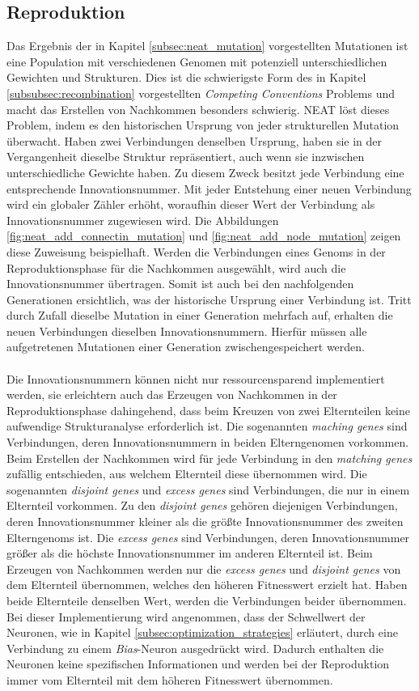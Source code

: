 \subsection{Reproduktion}
\label{subsec:neat_reproduction}
Das Ergebnis der in Kapitel \ref{subsec:neat_mutation} vorgestellten Mutationen ist eine Population mit verschiedenen Genomen mit potenziell unterschiedlichen Gewichten und Strukturen. Dies ist die schwierigste Form des in Kapitel \ref{subsubsec:recombination} vorgestellten \emph{Competing Conventions} Problems und macht das Erstellen von Nachkommen besonders schwierig. \ac{NEAT} löst dieses Problem, indem es den historischen Ursprung von jeder strukturellen Mutation überwacht. Haben zwei Verbindungen denselben Ursprung, haben sie in der Vergangenheit dieselbe Struktur repräsentiert, auch wenn sie inzwischen unterschiedliche Gewichte haben. Zu diesem Zweck besitzt jede Verbindung eine entsprechende Innovationsnummer. Mit jeder Entstehung einer neuen Verbindung wird ein globaler Zähler erhöht, woraufhin dieser Wert der Verbindung als Innovationsnummer zugewiesen wird. Die Abbildungen \ref{fig:neat_add_connectin_mutation} und \ref{fig:neat_add_node_mutation} zeigen diese Zuweisung beispielhaft. Werden die Verbindungen eines Genoms in der Reproduktionsphase für die Nachkommen ausgewählt, wird auch die Innovationsnummer übertragen. Somit ist auch bei den nachfolgenden Generationen ersichtlich, was der historische Ursprung einer Verbindung ist. Tritt durch Zufall dieselbe Mutation in einer Generation mehrfach auf, erhalten die neuen Verbindungen dieselben Innovationsnummern. Hierfür müssen alle aufgetretenen Mutationen einer Generation zwischengespeichert werden. 
\\\\
Die Innovationsnummern können nicht nur ressourcensparend implementiert werden, sie erleichtern auch das Erzeugen von Nachkommen in der Reproduktionsphase dahingehend, dass beim Kreuzen von zwei Elternteilen keine aufwendige Strukturanalyse erforderlich ist. Die sogenannten \emph{maching genes} sind Verbindungen, deren Innovationsnummern in beiden Elterngenomen vorkommen. Beim Erstellen der Nachkommen wird für jede Verbindung in den \emph{matching genes} zufällig entschieden, aus welchem Elternteil diese übernommen wird. Die sogenannten \emph{disjoint genes} und \emph{excess genes} sind Verbindungen, die nur in einem Elternteil vorkommen. Zu den \emph{disjoint genes} gehören diejenigen Verbindungen, deren Innovationsnummer kleiner als die größte Innovationsnummer des zweiten Elterngenoms ist. Die \emph{excess genes} sind Verbindungen, deren Innovationsnummer größer als die höchste Innovationsnummer im anderen Elternteil ist. Beim Erzeugen von Nachkommen werden nur die \emph{excess genes} und \emph{disjoint genes} von dem Elternteil übernommen, welches den höheren Fitnesswert erzielt hat. Haben beide Elternteile denselben Wert, werden die Verbindungen beider übernommen. 
Bei dieser Implementierung wird angenommen, dass der Schwellwert der Neuronen, wie in Kapitel \ref{subsec:optimization_strategies} erläutert, durch eine Verbindung zu einem \emph{Bias}-Neuron ausgedrückt wird. Dadurch enthalten die Neuronen keine spezifischen Informationen und werden bei der Reproduktion immer vom Elternteil mit dem höheren Fitnesswert übernommen.
